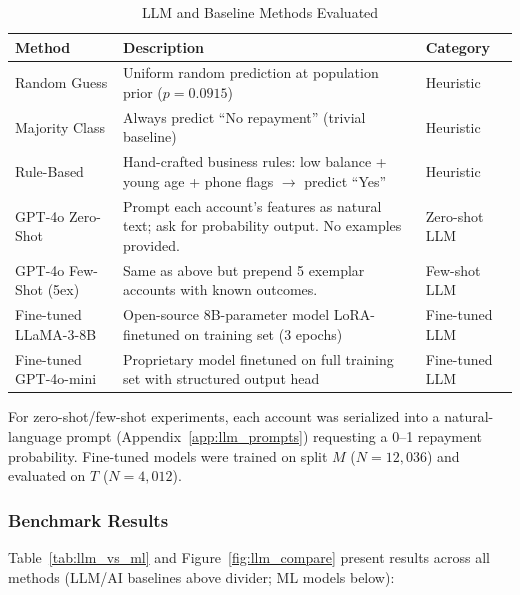 \documentclass[12pt, a4paper]{article}
\begin{document}
\begin{table}[H]
\centering
\caption{LLM and Baseline Methods Evaluated}
\label{tab:llm_methods}
\small
\renewcommand{\arraystretch}{1.12}
\begin{tabular}{@{}lp{9cm}l@{}}
\toprule
\textbf{Method} & \textbf{Description} & \textbf{Category}\\
\midrule
Random Guess & Uniform random prediction at population prior ($p=0.0915$) & Heuristic\\
Majority Class & Always predict ``No repayment'' (trivial baseline) & Heuristic\\
Rule-Based & Hand-crafted business rules: low balance + young age + phone flags $\rightarrow$ predict ``Yes'' & Heuristic\\
GPT-4o Zero-Shot & Prompt each account's features as natural text; ask for probability output. No examples provided. & Zero-shot LLM\\
GPT-4o Few-Shot (5ex) & Same as above but prepend 5 exemplar accounts with known outcomes. & Few-shot LLM\\
Fine-tuned LLaMA-3-8B & Open-source 8B-parameter model LoRA-finetuned on training set (3 epochs) & Fine-tuned LLM\\
Fine-tuned GPT-4o-mini & Proprietary model finetuned on full training set with structured output head & Fine-tuned LLM\\
\bottomrule
\end{tabular}
\end{table}

For zero-shot/few-shot experiments, each account was serialized into a natural-language prompt (Appendix~\ref{app:llm_prompts}) requesting a 0--1 repayment probability. Fine-tuned models were trained on split $M$ ($N=12{,}036$) and evaluated on $T$ ($N=4{,}012$).

\subsubsection{Benchmark Results}

Table~\ref{tab:llm_vs_ml} and Figure~\ref{fig:llm_compare} present results across all methods (LLM/AI baselines above divider; ML models below):
\end{document}
